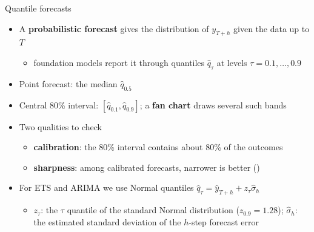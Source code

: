 \begin{frame}{Quantile forecasts}
\itemsize{\footnotesize}
\begin{itemize}
    \item A \textbf{probabilistic forecast} gives the distribution of $y_{T+h}$ given the data up to $T$
    \begin{itemize}
        \item foundation models report it through quantiles $\hat q_\tau$ at levels $\tau = 0.1, \dots, 0.9$
    \end{itemize}
    \item Point forecast: the median $\hat q_{0.5}$
    \item Central 80\% interval: $[\hat q_{0.1}, \hat q_{0.9}]$; a \textbf{fan chart} draws several such bands
    \item Two qualities to check
    \begin{itemize}
        \item \textbf{calibration}: the 80\% interval contains about 80\% of the outcomes
        \item \textbf{sharpness}: among calibrated forecasts, narrower is better ()
    \end{itemize}
    \item For ETS and ARIMA we use Normal quantiles $\hat q_\tau = \hat y_{T+h} + z_\tau \hat\sigma_h$
    \begin{itemize}
        \item $z_\tau$: the $\tau$ quantile of the standard Normal distribution ($z_{0.9} = 1.28$); $\hat\sigma_h$: the estimated standard deviation of the $h$-step forecast error
    \end{itemize}
\end{itemize}
\end{frame}

